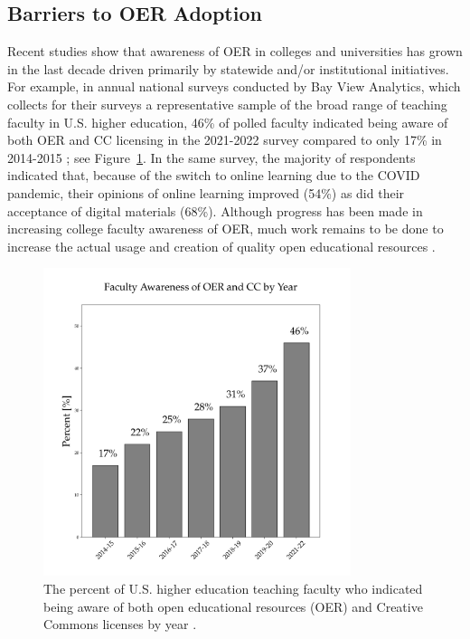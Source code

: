 \documentclass[11pt]{article}
\begin{document}
\subsection{Barriers to OER Adoption}
Recent studies show that awareness of OER in colleges and universities has grown in the last decade driven primarily by statewide and/or institutional initiatives.  For example, in annual national surveys conducted by Bay View Analytics, which collects for their surveys a representative sample of the broad range of teaching faculty in U.S. higher education, 46\% of polled faculty indicated being aware of both OER and CC licensing in the 2021-2022 survey compared to only 17\% in 2014-2015 \cite{JS-JS:2022}; see Figure~\ref{fig:oer-awareness}.  In the same survey, the majority of respondents indicated that, because of the switch to online learning due to the COVID pandemic, their opinions of online learning improved (54\%) as did their acceptance of digital materials (68\%).  Although progress has been made in increasing college faculty awareness of OER, much work remains to be done to increase the actual usage and creation of quality open educational resources \cite{MB:2022, flvc2022}.
\begin{figure}[t]
\centering
\includegraphics[width=90mm]{oer_awareness.png}
\caption{The percent of U.S. higher education teaching faculty who indicated being aware of both open educational resources (OER) and Creative Commons licenses by year \cite{JS-JS:2022}.}
\label{fig:oer-awareness}
\end{figure}
\end{document}
